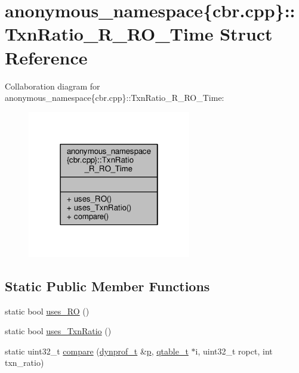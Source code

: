 \hypertarget{structanonymous__namespace_02cbr_8cpp_03_1_1TxnRatio__R__RO__Time}{\section{anonymous\-\_\-namespace\{cbr.\-cpp\}\-:\-:Txn\-Ratio\-\_\-\-R\-\_\-\-R\-O\-\_\-\-Time Struct Reference}
\label{structanonymous__namespace_02cbr_8cpp_03_1_1TxnRatio__R__RO__Time}
}


Collaboration diagram for anonymous\-\_\-namespace\{cbr.\-cpp\}\-:\-:Txn\-Ratio\-\_\-\-R\-\_\-\-R\-O\-\_\-\-Time\-:
\nopagebreak
\begin{figure}[H]
\begin{center}
\leavevmode
\includegraphics[width=202pt]{structanonymous__namespace_02cbr_8cpp_03_1_1TxnRatio__R__RO__Time__coll__graph}
\end{center}
\end{figure}
\subsection*{Static Public Member Functions}
\begin{DoxyCompactItemize}
\item 
static bool \hyperlink{structanonymous__namespace_02cbr_8cpp_03_1_1TxnRatio__R__RO__Time_a0412dca426e32defc746e9ca1f253cc0}{uses\-\_\-\-R\-O} ()
\item 
static bool \hyperlink{structanonymous__namespace_02cbr_8cpp_03_1_1TxnRatio__R__RO__Time_a883992496d74573b0f050ceb2098ecd4}{uses\-\_\-\-Txn\-Ratio} ()
\item 
static uint32\-\_\-t \hyperlink{structanonymous__namespace_02cbr_8cpp_03_1_1TxnRatio__R__RO__Time_aa88b0900c656e5e525cddc65885ec4c0}{compare} (\hyperlink{structstm_1_1dynprof__t}{dynprof\-\_\-t} \&\hyperlink{counted__ptr_8hpp_a5c9f59d7c24e3fd6ceae319a968fc3e0}{p}, \hyperlink{structstm_1_1qtable__t}{qtable\-\_\-t} $\ast$i, uint32\-\_\-t ropct, int txn\-\_\-ratio)
\end{DoxyCompactItemize}


